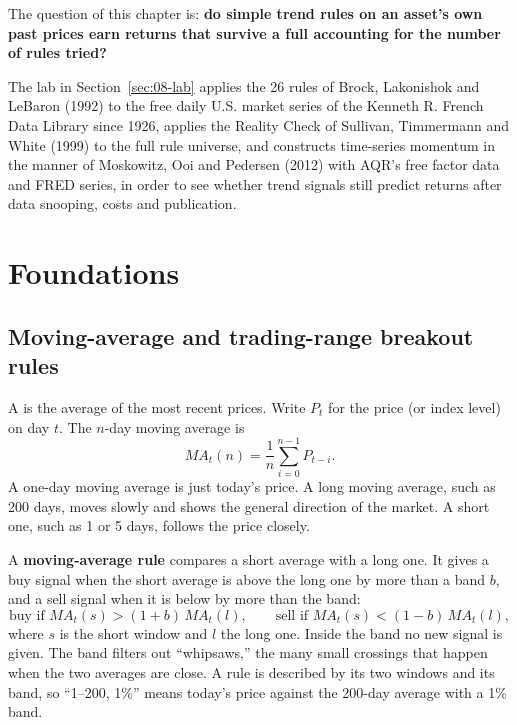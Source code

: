 The question of this chapter is: \textbf{do simple trend rules on an asset's own past prices earn returns that survive a full accounting for the number of rules tried?}

The lab in Section~\ref{sec:08-lab} applies the 26 rules of Brock, Lakonishok and LeBaron (1992) to the free daily U.S. market series of the Kenneth R. French Data Library since 1926, applies the Reality Check of Sullivan, Timmermann and White (1999) to the full rule universe, and constructs time-series momentum in the manner of Moskowitz, Ooi and Pedersen (2012) with AQR's free factor data and FRED series, in order to see whether trend signals still predict returns after data snooping, costs and publication.


\section{Foundations}
\label{sec:08-foundations}

\subsection{Moving-average and trading-range breakout rules}

A  is the average of the most recent prices. Write $P_t$ for the price (or index level) on day $t$. The $n$-day moving average is
\begin{equation}
  MA_t(n) = \frac{1}{n} \sum_{i=0}^{n-1} P_{t-i}.
  \label{eq:08-ma}
\end{equation}
A one-day moving average is just today's price. A long moving average, such as 200 days, moves slowly and shows the general direction of the market. A short one, such as 1 or 5 days, follows the price closely.

A \textbf{moving-average rule} compares a short average with a long one. It gives a buy signal when the short average is above the long one by more than a band $b$, and a sell signal when it is below by more than the band:
\begin{equation}
  \text{buy if } MA_t(s) > (1+b)\,MA_t(l), \qquad \text{sell if } MA_t(s) < (1-b)\,MA_t(l),
  \label{eq:08-marule}
\end{equation}
where $s$ is the short window and $l$ the long one. Inside the band no new signal is given. The band filters out ``whipsaws,'' the many small crossings that happen when the two averages are close. A rule is described by its two windows and its band, so ``1--200, 1\%'' means today's price against the 200-day average with a 1\% band.

